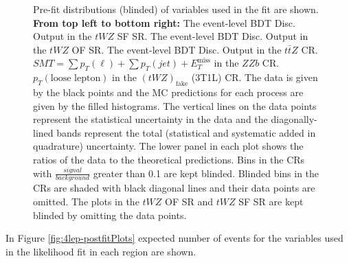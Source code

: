 \begin{figure}[htbp]
        \caption{Pre-fit distributions (blinded) of variables used in the fit are shown. \textbf{From top left to bottom right:} The event-level BDT Disc. Output in the $tWZ$ SF SR. The event-level BDT Disc. Output in the $tWZ$ OF SR. The event-level BDT Disc. Output in the $t\bar{t}Z$ CR. $SMT = \sum p_{T} (\ell) + \sum p_{T} (jet) + E_{T}^{\text{miss}}$ in the $ZZb$ CR. $p_{T}(\text{loose lepton})$ in the $(tWZ)_{\text{fake}}$ (3T1L) CR. The data is given by the black points and the MC predictions for each process are given by the filled histograms. The vertical lines on the data points represent the statistical uncertainty in the data and the diagonally-lined bands represent the total (statistical and systematic added in quadrature) uncertainty. The lower panel in each plot shows the ratios of the data to the theoretical predictions. Bins in the CRs with $\frac{signal}{background}$ greater than 0.1 are kept blinded. Blinded bins in the CRs are shaded with black diagonal lines and their data points are omitted. The plots in the $tWZ$ OF SR and $tWZ$ SF SR are kept blinded by omitting the data points.}
  \label{fig:4lep-prefitPlots}
\end{figure}


In Figure \ref{fig:4lep-postfitPlots} expected number of events for the variables used in the likelihood fit in each region are shown.

